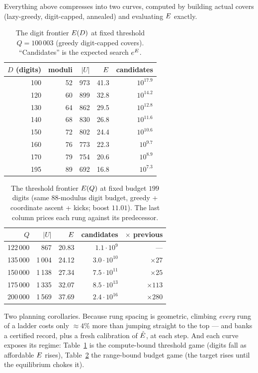 Everything above compresses into two curves, computed by building actual
covers (lazy-greedy, digit-capped, annealed) and evaluating $E$
exactly.

\begin{table}[h]
\centering\small
\caption{The digit frontier $E(D)$ at fixed threshold $Q=100\,003$
(greedy digit-capped covers). ``Candidates'' is the expected search
$e^{E}$.}\label{tab:ED}
\begin{tabular}{rrrrr}
\toprule
$D$ (digits) & moduli & $|U|$ & $E$ & candidates\\
\midrule
100 & 52 & 973 & 41.3 & $10^{17.9}$\\
120 & 60 & 899 & 32.8 & $10^{14.2}$\\
130 & 64 & 862 & 29.5 & $10^{12.8}$\\
140 & 68 & 830 & 26.8 & $10^{11.6}$\\
150 & 72 & 802 & 24.4 & $10^{10.6}$\\
160 & 76 & 773 & 22.3 & $10^{9.7}$\\
170 & 79 & 754 & 20.6 & $10^{8.9}$\\
195 & 89 & 692 & 16.8 & $10^{7.3}$\\
\bottomrule
\end{tabular}
\end{table}

\begin{table}[h]
\centering\small
\caption{The threshold frontier $E(Q)$ at fixed budget $199$ digits
(same $88$-modulus digit budget, greedy + coordinate ascent + kicks;
boost $11.01$). The last column prices each rung against its
predecessor.}\label{tab:EQ}
\begin{tabular}{rrrrr}
\toprule
$Q$ & $|U|$ & $E$ & candidates & $\times$ previous\\
\midrule
122\,000 & 867 & 20.83 & $1.1\cdot10^{9}$ & ---\\
135\,000 & 1\,004 & 24.12 & $3.0\cdot10^{10}$ & $\times27$\\
150\,000 & 1\,138 & 27.34 & $7.5\cdot10^{11}$ & $\times25$\\
175\,000 & 1\,335 & 32.07 & $8.5\cdot10^{13}$ & $\times113$\\
200\,000 & 1\,569 & 37.69 & $2.4\cdot10^{16}$ & $\times280$\\
\bottomrule
\end{tabular}
\end{table}

Two planning corollaries. Because rung spacing is geometric, climbing
\emph{every} rung of a ladder costs only $\approx4\%$ more than jumping
straight to the top --- and banks a certified record, plus a fresh
calibration of $\hat{E}$, at each step. And each curve exposes its
regime: Table~\ref{tab:ED} is the compute-bound threshold game (digits
fall as affordable $E$ rises), Table~\ref{tab:EQ} the range-bound
budget game (the target rises until the equilibrium chokes it).

